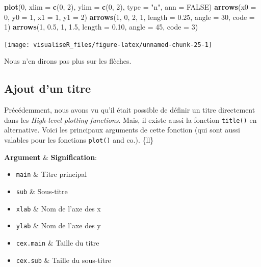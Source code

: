 \documentclass[]{article}
\newenvironment{Shaded}{\begin{snugshade}}{\end{snugshade}}
\newcommand{\DataTypeTok}[1]{\textcolor[rgb]{0.13,0.29,0.53}{#1}}
\newcommand{\DecValTok}[1]{\textcolor[rgb]{0.00,0.00,0.81}{#1}}
\newcommand{\FloatTok}[1]{\textcolor[rgb]{0.00,0.00,0.81}{#1}}
\newcommand{\KeywordTok}[1]{\textcolor[rgb]{0.13,0.29,0.53}{\textbf{#1}}}
\newcommand{\NormalTok}[1]{#1}
\newcommand{\OtherTok}[1]{\textcolor[rgb]{0.56,0.35,0.01}{#1}}
\newcommand{\StringTok}[1]{\textcolor[rgb]{0.31,0.60,0.02}{#1}}
\providecommand{\tightlist}{%
  \setlength{\itemsep}{0pt}\setlength{\parskip}{0pt}}
\begin{document}
\begin{Shaded}
\begin{Highlighting}[]
\KeywordTok{plot}\NormalTok{(}\DecValTok{0}\NormalTok{, }\DataTypeTok{xlim =} \KeywordTok{c}\NormalTok{(}\DecValTok{0}\NormalTok{, }\DecValTok{2}\NormalTok{), }\DataTypeTok{ylim =} \KeywordTok{c}\NormalTok{(}\DecValTok{0}\NormalTok{, }\DecValTok{2}\NormalTok{), }\DataTypeTok{type =} \StringTok{"n"}\NormalTok{, }\DataTypeTok{ann =} \OtherTok{FALSE}\NormalTok{)}
\KeywordTok{arrows}\NormalTok{(}\DataTypeTok{x0 =} \DecValTok{0}\NormalTok{, }\DataTypeTok{y0 =} \DecValTok{1}\NormalTok{, }\DataTypeTok{x1 =} \DecValTok{1}\NormalTok{, }\DataTypeTok{y1 =} \DecValTok{2}\NormalTok{)}
\KeywordTok{arrows}\NormalTok{(}\DecValTok{1}\NormalTok{, }\DecValTok{0}\NormalTok{, }\DecValTok{2}\NormalTok{, }\DecValTok{1}\NormalTok{, }\DataTypeTok{length =} \FloatTok{0.25}\NormalTok{, }\DataTypeTok{angle =} \DecValTok{30}\NormalTok{, }\DataTypeTok{code =} \DecValTok{1}\NormalTok{)}
\KeywordTok{arrows}\NormalTok{(}\DecValTok{1}\NormalTok{, }\FloatTok{0.5}\NormalTok{, }\DecValTok{1}\NormalTok{, }\FloatTok{1.5}\NormalTok{, }\DataTypeTok{length =} \FloatTok{0.10}\NormalTok{, }\DataTypeTok{angle =} \DecValTok{45}\NormalTok{, }\DataTypeTok{code =} \DecValTok{3}\NormalTok{)}
\end{Highlighting}
\end{Shaded}

\begin{center}\texttt{[image: visualiseR\_files/figure-latex/unnamed-chunk-25-1]} \end{center}

Nous n'en dirons pas plus sur les flèches.

\hypertarget{ajout-dun-titre}{%
\subsection{Ajout d'un titre}\label{ajout-dun-titre}}

Précédemment, nous avons vu qu'il était possible de définir un titre directement dans les \emph{High-level plotting functions}. Mais, il existe aussi la fonction \texttt{title()} en alternative. Voici les principaux arguments de cette fonction (qui sont aussi valables pour les fonctions \texttt{plot()} and co.).
\{ll\}

\textbf{Argument} \& \textbf{Signification}:

\begin{itemize}
\tightlist
\item
  \texttt{main} \& Titre principal
\item
  \texttt{sub} \& Sous-titre
\item
  \texttt{xlab} \& Nom de l'axe des x
\item
  \texttt{ylab} \& Nom de l'axe des y
\item
  \texttt{cex.main} \& Taille du titre
\item
  \texttt{cex.sub} \& Taille du sous-titre
\end{itemize}
\end{document}
